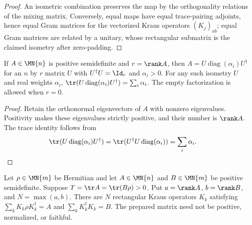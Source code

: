 \begin{proof}
    \leanok
    An isometric combination preserves the map by the orthogonality
    relations of the mixing matrix. Conversely, equal maps have equal
    trace-pairing adjoints, hence equal Gram matrices
    for the vectorized Kraus operators $(K_j)_{ab}$; equal Gram matrices
    are related by a unitary, whose rectangular submatrix is the claimed
    isometry after zero-padding.
\end{proof}

\begin{lemma}
    \label{lem:compact_spectral_isometry}
    \leanok
    If $A\in \MN{n}$ is positive semidefinite and $r=\rank A$, then
    $A=U\operatorname{diag}(\alpha_i)U^\dagger$ for an $n$ by $r$
    matrix $U$ with $U^\dagger U=\Id_r$ and $\alpha_i>0$.
    For any such isometry $U$ and real weights $\alpha_i$,
    $\tr(U\operatorname{diag}(\alpha_i)U^\dagger)=\sum_i\alpha_i$.
    The empty factorization is allowed when $r=0$.
\end{lemma}

\begin{proof}
    \leanok
    Retain the orthonormal eigenvectors of $A$ with nonzero eigenvalues.
    Positivity makes these eigenvalues strictly positive, and their
    number is $\rank A$. The trace identity follows from
    \begin{align}
        \tr(U\operatorname{diag}(\alpha_i)U^\dagger)
        &= \tr(U^\dagger U\operatorname{diag}(\alpha_i))
        = \sum_i\alpha_i.
        \label{eq:compact_spectral_trace}
    \end{align}
\end{proof}

\begin{theorem}
    \label{thm:kraus_state_effect_coupling_max}
    \leanok
    Let $\rho\in \MN{m}$ be Hermitian and let $A\in \MN{n}$ and
    $B\in \MN{m}$ be positive semidefinite. Suppose
    $T=\tr A=\tr(B\rho)>0$. Put $a=\rank A$, $b=\rank B$, and
    $N=\max(a,b)$. There are $N$ rectangular Kraus operators $K_k$
    satisfying $\sum_k K_k\rho K_k^\dagger=A$ and
    $\sum_k K_k^\dagger K_k=B$. The prepared matrix need not be
    positive, normalized, or faithful.
\end{theorem}

